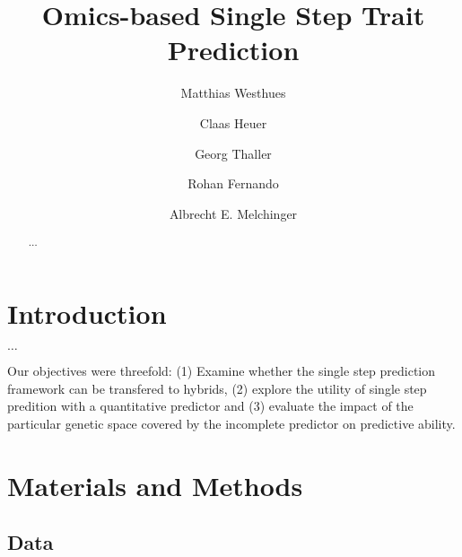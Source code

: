 \documentclass[]{elsarticle} %
\begin{document}
\begin{frontmatter}

  \title{Omics-based Single Step Trait Prediction}
    \author[University of Hohenheim]{Matthias Westhues}
  
    \author[University of Kiel]{Claas Heuer}
  
    \author[University of Kiel]{Georg Thaller}
  
    \author[Iowa State University]{Rohan Fernando}
  
    \author[University of Hohenheim]{Albrecht E. Melchinger}
      \address[University of Hohenheim]{Institute of Plant Breeding, Seed Science and Population Genetics,
Fruwirthstr. 21, 70599 Stuttgart, Germany}
    \address[University of Kiel]{Institut of Animal Breeding and Husbandry, Hermann-Rodewald-Straße 6,
24118 Kiel, Germany}
    \address[Iowa State University]{Department of Animal Science, 239 Kildee Hall, 50011 Ames, Iowa, U.S.A.}
  
  \begin{abstract}
  \(\dots\)
  \end{abstract}
  
 \end{frontmatter}

\section{Introduction}\label{introduction}

\(\dots\)

Our objectives were threefold: (1) Examine whether the single step
prediction framework can be transfered to hybrids, (2) explore the
utility of single step predition with a quantitative predictor and (3)
evaluate the impact of the particular genetic space covered by the
incomplete predictor on predictive ability.

\section{Materials and Methods}\label{materials-and-methods}

\subsection{Data}\label{data}
\end{document}
